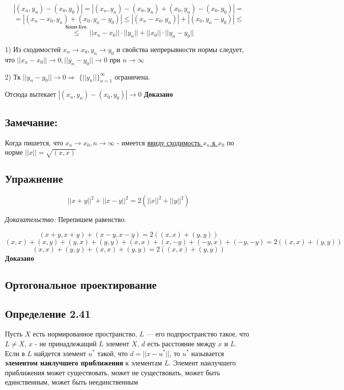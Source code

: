 \documentclass[12pt]{article}
\begin{document}
	$$|(x_n,y_n) - (x_0, y_0)| = |(x_n,y_n) - (x_0, y_n) + (x_0, y_n) - (x_0, y_0)| = $$
	$$ = |(x_n - x_0, y_n) + (x_0, y_n - y_0)| \leq |(x_n - x_0, y_n)| + |(x_0, y_n - y_0)| \leq$$
	$$\stackrel{\text{Коши-Бун.}}{\leq} ||x_n - x_0|| \cdot ||y_n|| + ||x_0||\cdot ||y_n - y_0||$$

1) Из сходимостей $x_n \to x_0, y_n \to y_0$ и свойства непрерывности нормы следует, что $||x_n - x_0|| \to 0, ||y_n - y_0|| \to 0$ при $n \to \infty$

2) Тк $||y_n - y_0|| \to 0 \Rightarrow$ 
 $\{ ||y_n|| \}_{n = 1}^{\infty}$ ограничена.
 
Отсюда вытекает $|(x_n,y_n) - (x_0, y_0)| \to 0$ \textbf{Доказано}

\subsection{Замечание:}
	Когда пишется, что $x_n \to x_0, n \to \infty$ - имеется \hyperref[eq103]{ввиду сходимость $x_n$ к $x_0$} по норме
		$||x|| = \sqrt{(x,x)} $

\subsection*{Упражнение}
		
	$$||x+y||^2 + ||x-y||^2 = 2(||x||^2 + ||y||^2)$$
	
\textit{Доказательство:} Перепишем равенство:
		
	$$(x+y , x+y) + (x-y , x-y) = 2((x,x) + (y,y))$$
	$$(x,x) + (x,y) + (y,x) + (y,y) + (x,x) + (x,-y) + (-y,x) + (-y,-y) = 2((x,x) + (y,y))$$
	$$(x,x) + (y,y) + (x,x) + (y,y) = 2((x,x) + (y,y))$$ \textbf{Доказано}
	

\newpage

\subsection{Ортогональное проектирование}	

\subsection*{Определение 2.41}
	Пусть $X$ есть нормированное пространство, $L$ — его подпространство такое, что $L \neq X$, $x$ - не принадлежащий $L$ элемент $X$, $d$ есть расстояние
между $x$ и $L$. Если в $L$ найдется элемент $u^*$ такой, что $d = ||x-u^*||$,
то $u^*$ называется \textbf{элементом наилучшего приближения} к элементам $L$. Элемент наилучшего приближения может существовать, может
не существовать, может быть единственным, может быть неединственным	
\end{document}
